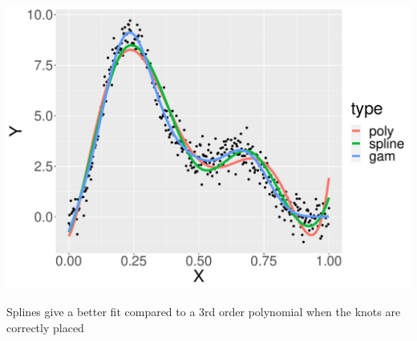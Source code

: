 \documentclass[12pt]{article}
\begin{document}
\begin{center}
\includegraphics[clip=true, trim=0cm 0cm 0cm 0cm,width=1\textwidth]{./figures/comparison.pdf}
\end{center}


Splines give a better fit compared to a 3rd order polynomial when the knots are correctly placed
\end{document}
